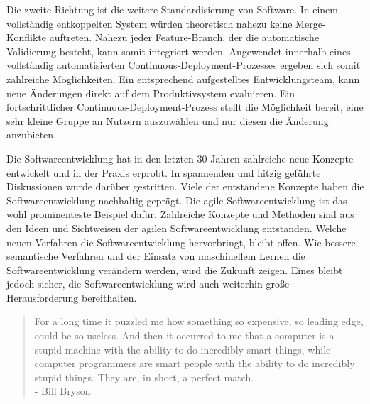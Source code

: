 Die zweite Richtung ist die weitere Standardisierung von Software. In einem vollständig entkoppelten System würden theoretisch nahezu keine Merge-Konflikte auftreten. Nahezu jeder Feature-Branch, der die automatische Validierung besteht, kann somit integriert werden. Angewendet innerhalb eines vollständig automatisierten Continuous-Deployment-Prozesses ergeben sich somit zahlreiche Möglichkeiten. Ein entsprechend aufgestelltes Entwicklungsteam, kann neue Änderungen direkt auf dem Produktivsystem evaluieren. Ein fortschrittlicher Continuous-Deployment-Prozess stellt die Möglichkeit bereit, eine sehr kleine Gruppe an Nutzern auszuwählen und nur diesen die Änderung anzubieten.

Die Softwareentwicklung hat in den letzten 30 Jahren zahlreiche neue Konzepte entwickelt und in der Praxis erprobt. In spannenden und hitzig geführte Diskussionen wurde darüber gestritten. Viele der entstandene Konzepte haben die Softwareentwicklung nachhaltig geprägt. Die agile Softwareentwicklung ist das wohl prominenteste Beispiel dafür. Zahlreiche Konzepte und Methoden sind aus den Ideen und Sichtweisen der agilen Softwareentwicklung entstanden. Welche neuen Verfahren die Softwareentwicklung hervorbringt, bleibt offen. Wie bessere semantische Verfahren und der Einsatz von maschinellem Lernen die Softwareentwicklung verändern werden, wird die Zukunft zeigen. Eines bleibt jedoch sicher, die Softwareentwicklung wird auch weiterhin große Herausforderung bereithalten.

\blockquote {For a long time it puzzled me how something so expensive, so leading edge, could be so useless. And then it occurred to me that a computer is a stupid machine with the ability to do incredibly smart things, while computer programmers are smart people with the ability to do incredibly stupid things. They are, in short, a perfect match. \\- Bill Bryson}
